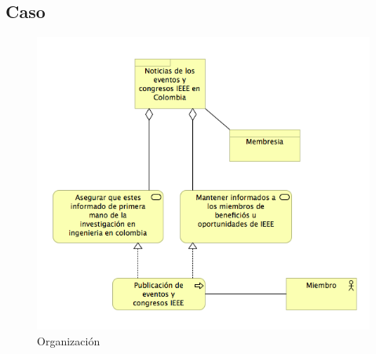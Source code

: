 \subsection{Caso}
\begin{figure}[th!]
	\centering
	\includegraphics[width=0.8\linewidth]{arquitectura_diseno/imgs/C_Producto}
	\caption{Organización}
\end{figure}